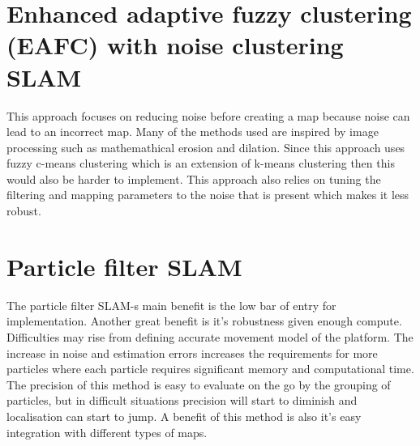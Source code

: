 \documentclass[12pt, a4paper, onecolumn]{article}
\begin{document}
\section{Enhanced adaptive fuzzy clustering (EAFC) with noise clustering SLAM \cite{AlgorithmsForIndoorMapping}}
This approach focuses on reducing noise before creating a map because noise can lead to an incorrect map.
Many of the methods used are inspired by image processing such as mathemathical erosion and dilation.
Since this approach uses fuzzy c-means clustering which is an extension of k-means clustering then this would also be harder to implement.
This approach also relies on tuning the filtering and mapping parameters to the noise that is present which makes it less robust.

\section{Particle filter SLAM \cite{ParticleFilterSLAM}}
The particle filter SLAM-s main benefit is the low bar of entry for implementation.
Another great benefit is it's robustness given enough compute.
Difficulties may rise from defining accurate movement model of the platform.
The increase in noise and estimation errors increases the requirements for more particles where each particle requires significant memory and computational time.
The precision of this method is easy to evaluate on the go by the grouping of particles, but in difficult situations precision will start to diminish and localisation can start to jump.
A benefit of this method is also it's easy integration with different types of maps.
\end{document}
